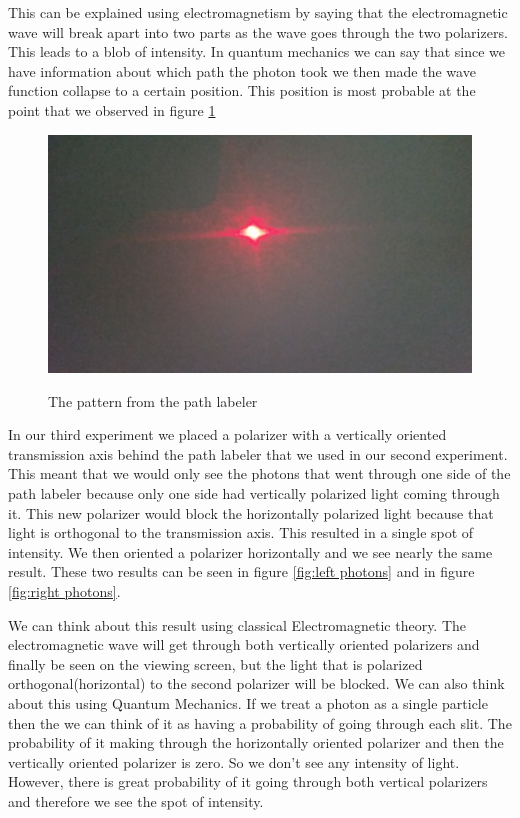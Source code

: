 \documentclass[12pt letterpaper]{article}
\begin{document}
This can be explained using electromagnetism by saying that the electromagnetic wave will break apart into two parts as the wave goes through the two polarizers. This leads to a blob of intensity. In quantum mechanics we can say that since we have information about which path the photon took we then made the wave function collapse to a certain position. This position is most probable at the point that we observed in figure \ref{fig:path_label}  

\begin{figure}[H]
  \caption{The pattern from the path labeler}
  \centering
    \includegraphics[width=.75\textwidth]{pathlabel.jpg}
    \label{fig:path_label}
\end{figure}

In our third experiment we placed a polarizer with a vertically oriented transmission axis behind the path labeler that we used in our second experiment. This meant that we would only see the photons that went through one side of the path labeler because only one side had vertically polarized light coming through it. This new polarizer would block the horizontally polarized light because that light is orthogonal to the transmission axis. This resulted in a single spot of intensity. We then oriented a polarizer horizontally and we see nearly the same result. These two results can be seen in figure \ref{fig:left photons} and in figure \ref{fig:right photons}. 

We can think about this result using classical Electromagnetic theory. The electromagnetic wave will get through both vertically oriented polarizers and finally be seen on the viewing screen, but the light that is polarized orthogonal(horizontal) to the second polarizer will be blocked. We can also think about this using Quantum Mechanics. If we treat a photon as a single particle then the we can think of it as having a probability of going through each slit. The probability of it making through the horizontally oriented polarizer and then the vertically oriented polarizer is zero. So we don't see any intensity of light. However, there is great probability of it going through both vertical polarizers and therefore we see the spot of intensity. 
\end{document}
